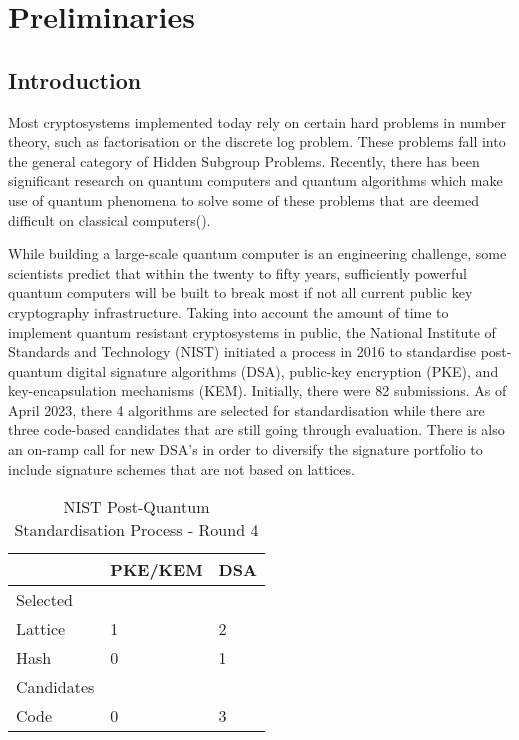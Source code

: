 \chapter{Preliminaries}


\section{Introduction}
Most cryptosystems implemented today rely on certain hard problems in number theory, such as factorisation or the discrete log problem. These problems fall into the general category of Hidden Subgroup Problems. Recently, there has been significant research on quantum computers and quantum algorithms which make use of quantum phenomena to solve some of these problems that are deemed difficult on classical computers(\cite{Shor,Jozsa,}). 

While building a large-scale quantum computer is an engineering challenge, some scientists predict that within the twenty to fifty years, sufficiently powerful quantum computers will be built to break most if not all current public key cryptography infrastructure. Taking into account the amount of time to implement quantum resistant cryptosystems in public, the National Institute of Standards and Technology (NIST) initiated a process in 2016 to standardise post-quantum digital signature algorithms (DSA), public-key encryption (PKE), and key-encapsulation mechanisms (KEM). Initially, there were 82 submissions. As of April 2023, there 4 algorithms are selected for standardisation while there are three code-based candidates that are still going through evaluation. There is also an on-ramp call for new DSA's in order to diversify the signature portfolio to include signature schemes that are not based on lattices.

\begin{table}[]
\centering
\begin{tabular}{lll}
\hline
 & PKE/KEM & DSA \\ \hline
Selected &  &  \\ \hline
Lattice & 1 & 2 \\
Hash & 0 & 1 \\ \hline
Candidates &  &  \\ \hline
Code & 0 & 3 \\ \hline
\end{tabular}
\caption{NIST Post-Quantum Standardisation Process - Round 4}
\end{table}

